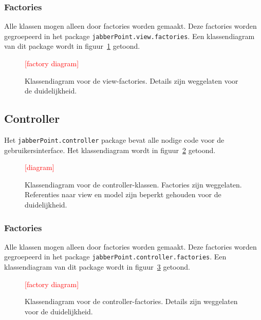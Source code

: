 \documentclass[a4paper]{article}
\newcommand{\todo}[1]{\textcolor{red}{[#1]}\\}
\newcommand{\code}[1]{\lstinline[columns=fixed]{#1}}
\begin{document}
		\subsubsection{Factories}
			Alle klassen mogen alleen door factories worden gemaakt.
			Deze factories worden gegroepeerd in het package \code{jabberPoint.view.factories}.
			Een klassendiagram van dit package wordt in figuur~\ref{fig:view-factories} getoond.

			\begin{figure}[!htb]
			 \caption{
				Klassendiagram voor de view-factories.\label{fig:view-factories}
				Details zijn weggelaten voor de duide\-lijk\-heid.
			 }
			 \todo{factory diagram} %
			\end{figure}

	\subsection{Controller}
		Het \code{jabberPoint.controller} package bevat alle nodige code voor de gebruikersinterface.
		Het klassendiagram wordt in figuur~\ref{fig:controller} getoond.

		\begin{figure}[!htb]
		 \caption{
			Klassendiagram voor de controller-klassen.\label{fig:controller}
			Factories zijn weggelaten.
			Referenties naar view en model zijn beperkt gehouden voor de duidelijkheid.
		 }
		 \todo{diagram} %
		\end{figure}

		\subsubsection{Factories}
			Alle klassen mogen alleen door factories worden gemaakt.
			Deze factories worden gegroepeerd in het package \code{jabberPoint.controller.factories}.
			Een klassendiagram van dit package wordt in figuur~\ref{fig:controller-factories} getoond.

			\begin{figure}[!htb]
			 \caption{
				Klassendiagram voor de controller-factories.\label{fig:controller-factories}
				Details zijn weggelaten voor de duide\-lijk\-heid.
			 }
			 \todo{factory diagram} %
			\end{figure}
\end{document}
